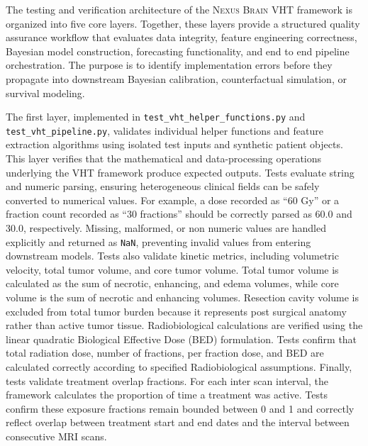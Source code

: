 The testing and verification architecture of the \textsc{Nexus Brain} VHT framework is organized into five core layers. Together, these layers provide a structured quality assurance workflow that evaluates data integrity, feature engineering correctness, Bayesian model construction, forecasting functionality, and end to end pipeline orchestration. The purpose is to identify implementation errors before they propagate into downstream Bayesian calibration, counterfactual simulation, or survival modeling.

The first layer, implemented in \texttt{test\_vht\_helper\_functions.py} and \texttt{test\_vht\_pipeline.py}, validates individual helper functions and feature extraction algorithms using isolated test inputs and synthetic patient objects. This layer verifies that the mathematical and data-processing operations underlying the VHT framework produce expected outputs. Tests evaluate string and numeric parsing, ensuring heterogeneous clinical fields can be safely converted to numerical values. For example, a dose recorded as “60 Gy” or a fraction count recorded as “30 fractions” should be correctly parsed as 60.0 and 30.0, respectively. Missing, malformed, or non numeric values are handled explicitly and returned as \texttt{NaN}, preventing invalid values from entering downstream models. Tests also validate kinetic metrics, including volumetric velocity, total tumor volume, and core tumor volume. Total tumor volume is calculated as the sum of necrotic, enhancing, and edema volumes, while core volume is the sum of necrotic and enhancing volumes. Resection cavity volume is excluded from total tumor burden because it represents post surgical anatomy rather than active tumor tissue. Radiobiological calculations are verified using the linear quadratic Biological Effective Dose (BED) formulation. Tests confirm that total radiation dose, number of fractions, per fraction dose, and BED are calculated correctly according to specified Radiobiological assumptions. Finally, tests validate treatment overlap fractions. For each inter scan interval, the framework calculates the proportion of time a treatment was active. Tests confirm these exposure fractions remain bounded between 0 and 1 and correctly reflect overlap between treatment start and end dates and the interval between consecutive MRI scans.

